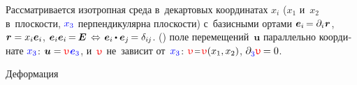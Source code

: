 \begin{otherlanguage}{russian}

Рассматривается изотропная среда в~декартовых координатах $x_i$ ($x_1$ и~$x_2$ в~плоскости, $\mathcolor{blue}{x_3}$ перпендикулярна плоскости)
с~базисными ортами
${\bm{e}_i \hspace{-0.2ex} = \partial_i \hspace{.1ex} \bm{r}}$\hbox{\hspace{-0.12ex},}
${\bm{r} = x_i \bm{e}_i}$,
${\bm{e}_i \bm{e}_i \hspace{-0.2ex} = \hspace{-0.15ex} \UnitDyad \,\Leftrightarrow\hspace{.25ex} \bm{e}_i \hspace{-0.1ex} \dotp \bm{e}_j \hspace{-0.2ex} = \delta_{i\hspace{-0.1ex}j}}$.
  () поле перемещений~$\bm{u}$ параллельно координате $\mathcolor{blue}{x_3}$:
${\bm{u} = \antiplanedisplacement \hspace{.12ex} \mathcolor{blue}{\bm{e}_3}}$, и~$\antiplanedisplacement$ не~зависит от~$\mathcolor{blue}{x_3}$: ${\antiplanedisplacement \narroweq \antiplanedisplacement(x_1, x_2)}$, ${\partial_{\raisemath{-0.15ex}{\mathcolor{blue}{3}}} \antiplanedisplacement \hspace{-0.15ex} = 0}$.

Деформация


\end{otherlanguage}

